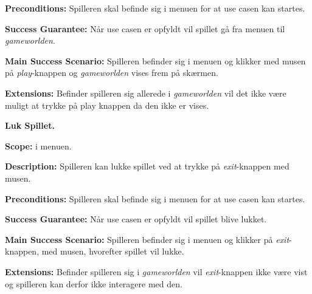 \textbf{Preconditions:}\newline
Spilleren skal befinde sig i menuen for at use casen kan startes.\newline

\textbf{Success Guarantee:}\newline
Når use casen er opfyldt vil spillet gå fra menuen til \textit{gameworlden}.\newline

\textbf{Main Success Scenario:}\newline
Spilleren befinder sig i menuen og klikker med musen på \textit{play}-knappen og \textit{gameworlden} vises frem på skærmen.\newline

\textbf{Extensions:}\newline
Befinder spilleren sig allerede i \textit{gameworlden} vil det ikke være muligt at trykke på play knappen da den ikke er vises.\newline \newline



\textbf{Luk Spillet.}\newline

\textbf{Scope:}\newline
i menuen. \newline

\textbf{Description:} \newline
Spilleren kan lukke spillet ved at trykke på \textit{exit}-knappen med musen.\newline

\textbf{Preconditions:}\newline
Spilleren skal befinde sig i menuen for at use casen kan startes.\newline

\textbf{Success Guarantee:}\newline
Når use casen er opfyldt vil spillet blive lukket. \newline

\textbf{Main Success Scenario:}\newline
Spilleren befinder sig i menuen og klikker på \textit{exit}-knappen, med musen, hvorefter spillet vil lukke.\newline

\textbf{Extensions:}\newline
Befinder spilleren sig i \textit{gameworlden} vil \textit{exit}-knappen ikke være vist og spilleren kan derfor ikke interagere med den. \newline \newline


